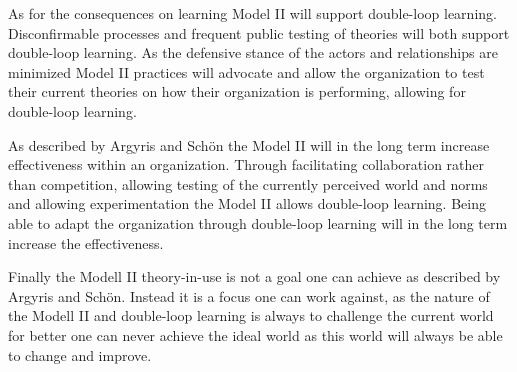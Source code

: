As for the consequences on learning Model II will support double-loop learning. Disconfirmable processes and frequent public testing of theories will both support double-loop learning. As the defensive stance of the actors and relationships are minimized Model II practices will advocate and allow the organization to test their current theories on how their organization is performing, allowing for double-loop learning. 

As described by Argyris and Schön the Model II will in the long term increase effectiveness within an organization. Through facilitating collaboration rather than competition, allowing testing of the currently perceived world and norms and allowing experimentation the Model II allows double-loop learning. Being able to adapt the organization through double-loop learning will in the long term increase the effectiveness. 

Finally the Modell II theory-in-use is not a goal one can achieve as described by Argyris and Schön. Instead it is a focus one can work against, as the nature of the Modell II and double-loop learning is always to challenge the current world for better one can never achieve the ideal world as this world will always be able to change and improve. 

